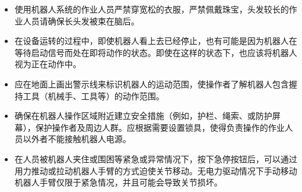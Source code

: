 \documentclass[a4paper,11pt,english,openany,oneside]{sphinxmanual}
\begin{document}
\begin{savenotes}
\begin{tabular}[t]{}
\begin{varwidth}[t]{}
\begin{itemize}
\item {} 
\sphinxAtStartPar
使用机器人系统的作业人员严禁穿宽松的衣服，严禁佩戴珠宝，头发较长的作业人员请确保长头发被束在脑后。

\item {} 
\sphinxAtStartPar
在设备运转的过程中，即使机器人看上去已经停止，也有可能是因为机器人在等待启动信号而处在即将动作的状态。即使在这样的状态下，也应该将机器人视为正在动作中。

\item {} 
\sphinxAtStartPar
应在地面上画出警示线来标识机器人的运动范围，使操作者了解机器人包含握持工具（机械手、工具等）的动作范围。

\item {} 
\sphinxAtStartPar
确保在机器人操作区域附近建立安全措施（例如，护栏、绳索、或防护屏幕），保护操作者及周边人群。应根据需要设置锁具，使得负责操作的作业人员以外者不能接触机器人电源。

\item {} 
\sphinxAtStartPar
在人员被机器人夹住或围困等紧急或异常情况下，按下急停按钮后，可以通过用力推动或拉动机器人手臂的方式迫使关节移动。无电力驱动情况下手动移动机器人手臂仅限于紧急情况，并且可能会导致关节损坏。

\end{itemize}
\sphinxbeforeendvarwidth
\end{varwidth}%
\\
\sphinxbottomrule
\end{tabular}
\sphinxtableafterendhook\par
\sphinxattableend\end{savenotes}
\end{document}
